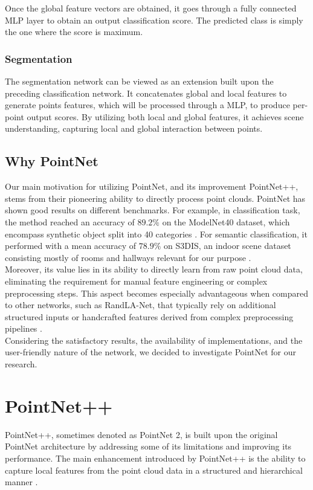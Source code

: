 Once the global feature vectors are obtained, it goes through a fully connected MLP layer to obtain an output classification score. The predicted class is simply the one where the score is maximum. 

\subsubsection{Segmentation}
The segmentation network can be viewed as an extension built upon the preceding classification network. It concatenates global and local features to generate points features, which will be processed through a MLP, to produce per-point output scores. By utilizing both local and global features, it achieves scene understanding, capturing local and global interaction between points.

\subsection{Why PointNet}
Our main motivation for utilizing PointNet, and its improvement PointNet++, stems from their pioneering ability to directly process point clouds. PointNet has shown good results on different benchmarks. For example, in classification task, the method reached an accuracy of $89.2\%$ on the ModelNet40 dataset, which encompass synthetic object split into 40 categories \cite{modelnet}. For semantic classification, it performed with a mean accuracy of $78.9 \%$ on S3DIS, an indoor scene dataset consisting mostly of rooms and hallways relevant for our purpose \cite{s3dis}.\\

Moreover, its value lies in its ability to directly learn from raw point cloud data, eliminating the requirement for manual feature engineering or complex preprocessing steps. This aspect becomes especially advantageous when compared to other networks, such as RandLA-Net, that typically rely on additional structured inputs or handcrafted features derived from complex preprocessing pipelines \cite{Randla-net}.\\

Considering the satisfactory results, the availability of implementations, and the user-friendly nature of the network, we decided to investigate PointNet for our research.

\section{PointNet++}
PointNet++, sometimes denoted as PointNet 2, is built upon the original PointNet architecture by addressing some of its limitations and improving its performance. The main enhancement introduced by PointNet++ is the ability to capture local features from the point cloud data in a structured and hierarchical manner \cite{PointNet2}.\\


